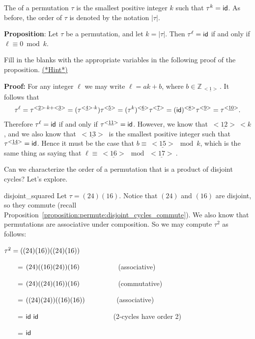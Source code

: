\begin{defn}
The  of a permutation $\tau$ is the smallest positive integer $k$ such that $\tau^k = {\sf{i}d}$.   As before, the order of $\tau$ is denoted by the notation $|\tau|$. 
\end{defn}



\noindent
{\bf Proposition}: Let $\tau$ be a permutation, and let $k = |\tau|$. Then $\tau^{\ell} = {\sf{i}d}$ if and only if $\ell \equiv 0 \bmod{k}$.
\medskip

\begin{exercise}{64}
Fill in the blanks with the appropriate variables in the following proof of the proposition.
\hyperref[sec:permute:hints]{(*Hint*)}
\medskip

\noindent
{\bf Proof:} For any integer $\ell$ we may write $\ell = ak + b$, where $b \in \mathbb{Z}_{\underline{~<1>~}} $. It follows that
\[ \tau^{\ell} = \tau^{<\underline{2}> \cdot k + <\underline{3}>} = (\tau^{<\underline{4}> \cdot k})\tau^{<\underline{5}>} =   (\tau^k)^{<\underline{6}>}\tau^{<\underline{7}>} = ({\sf{i}d})^{<\underline{8}>}\tau^{<\underline{9}>} = \tau^{<\underline{10}>} . \]
Therefore $\tau^{\ell} = {\sf{i}d}$ if and only if $\tau^{<\underline{11}>} = {\sf{i}d}$. However, we know that $\underline{~<12>~} < k$, and we also know that $\underline{~<13>~}$ is the smallest positive integer such that  $\tau^{<\underline{14}>} = {\sf{i}d}$. Hence it must be the case that $b \equiv \underline{~<15>~} \bmod{k}$, which is the same thing as saying that  $\ell \equiv \underline{~<16>~} \bmod{\underline{~<17>~}}$.
\end{exercise}


Can we characterize the order of a permutation that is a product of disjoint cycles?  Let's explore.

\begin{example}{disjoint_squared}
Let $\tau = (2 4)(1 6).$ Notice that $(2 4)$ and $(1 6)$ are disjoint, so they commute (recall Proposition~\ref{proposition:permute:disjoint_cycles_commute}). We also know that permutations are associative under composition. So we may compute $\tau^2$ as follows:

\noindent
$\tau^2 = {\large(} (2 4 )(1 6 ) {\large )} {\large(} (2 4 )(1 6 ) {\large )}$
 
~~~~=  $(2 4) {\large(} (1 6) (2 4 ) {\large )} (1 6 )$~~~~~~~~~~~(associative) 

~~~~=  $(2 4 ) {\large(} (2 4 ) (1 6)  {\large )} (1 6 )$~~~~~~~~~~~(commutative) 

~~~~=  ${\large(}  (2 4 ) (2 4 ) {\large )} {\large(}  (1 6) (1 6 ) {\large )}$~~~~~~~~~(associative) 

~~~~=  ${\sf{i}d}~{\sf{i}d}$ ~~~~~~~~~~~~~~~~~~~~~(2-cycles have order 2) 

~~~~=  ${\sf{i}d}$   

\end{example}


